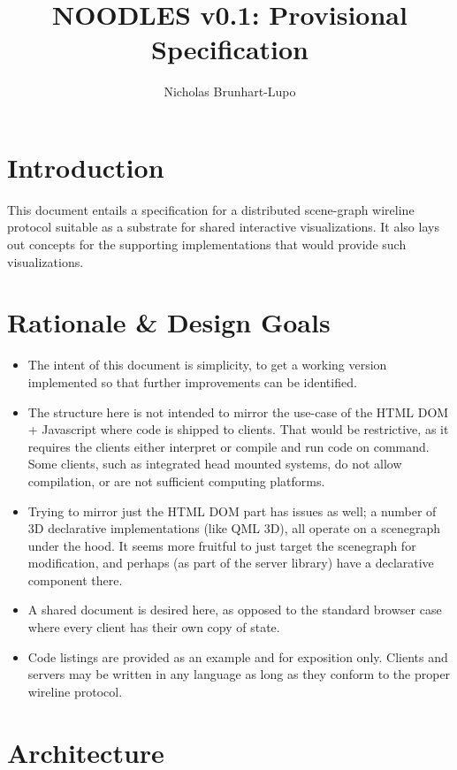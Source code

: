 \documentclass[11pt, oneside]{amsart}
\title{NOODLES v0.1: Provisional Specification}
\author{Nicholas Brunhart-Lupo}
\begin{document}
\maketitle
\tableofcontents

\section{Introduction}

This document entails a specification for a distributed scene-graph wireline protocol suitable as a substrate for shared interactive visualizations. It also lays out concepts for the supporting implementations that would provide such visualizations.


\section{Rationale \& Design Goals}

\begin{itemize}
\item The intent of this document is simplicity, to get a working version implemented so that further improvements can be identified.
\item The structure here is not intended to mirror the use-case of the HTML DOM + Javascript where code is shipped to clients. That would be restrictive, as it requires the clients either interpret or compile and run code on command. Some clients, such as integrated head mounted systems, do not allow compilation, or are not sufficient computing platforms. 
\item Trying to mirror just the HTML DOM part has issues as well; a number of 3D declarative implementations (like QML 3D), all operate on a scenegraph under the hood. It seems more fruitful to just target the scenegraph for modification, and perhaps (as part of the server library) have a declarative component there.
\item A shared document is desired here, as opposed to the standard browser case where every client has their own copy of state.
\item Code listings are provided as an example and for exposition only. Clients and servers may be written in any language as long as they conform to the proper wireline protocol.
\end{itemize}


\section{Architecture}
\end{document}
